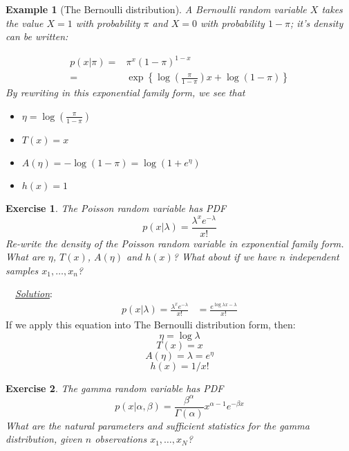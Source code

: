 \documentclass[twoside]{article}
\newcounter{lecnum}
\newtheorem{exercise}{Exercise}[lecnum]
\newtheorem{example}{Example}[lecnum]
\newenvironment{solution}{
  \begin{flushleft} \noindent ~~\underline{\emph{Solution}}: \rmfamily}{\end{flushleft}}
\begin{document}
\begin{example}[The Bernoulli distribution]
  A Bernoulli random variable $X$ takes the value $X=1$ with probability $\pi$ and $X=0$ with probability $1-\pi$; it's density can be written:

  $$\begin{aligned}
    p(x|\pi) =& \pi^x(1-\pi)^{1-x}\\
    =& \exp\left\{\log\left(\frac{\pi}{1-\pi}\right)x + \log(1-\pi)\right\}\end{aligned}$$
    By rewriting in this exponential family form, we see that
    \begin{itemize}
    \item $\eta = \log\left(\frac{\pi}{1-\pi}\right)$
    \item $T(x) = x$
    \item $A(\eta) = -\log(1-\pi) = \log(1+e^{\eta})$
    \item $h(x)=1$
    \end{itemize}
\end{example}

\begin{exercise}
  The Poisson random variable has PDF
  $$p(x|\lambda) = \frac{\lambda^xe^{-\lambda}}{x!}$$
  Re-write the density of the Poisson random variable in exponential family form. What are $\eta$, $T(x)$, $A(\eta)$ and $h(x)$? What about if we have $n$ independent samples $x_1,\dots, x_n$?
\end{exercise}

\begin{solution}
\begin{equation*}
\begin{split}
p(x|\lambda) = \frac{\lambda^xe^{-\lambda}}{x!} &= \frac{e^{\log{\lambda x}-\lambda}}{x!}
\end{split}
\end{equation*}
If we apply this equation into The Bernoulli distribution form, then:
$$ \eta = \log{\lambda} $$
$$ T(x) = x $$
$$ A(\eta) = \lambda = e^{\eta} $$ 
$$ h(x)=1/x! $$

\end{solution}


\begin{exercise}
  The gamma random variable has PDF
  $$p(x|\alpha,\beta) = \frac{\beta^\alpha}{\Gamma(\alpha)}x^{\alpha-1}e^{-\beta x}$$
  What are the natural parameters and sufficient statistics for the gamma distribution, given $n$ observations $x_1,\dots, x_N$?
\end{exercise}
\end{document}
